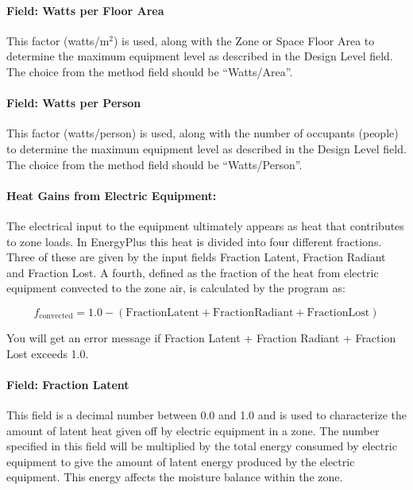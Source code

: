 \paragraph{Field: Watts per Floor Area}\label{field-watts-per-zone-floor-area-1}

This factor (watts/m\(^{2}\)) is used, along with the Zone or Space Floor Area to determine the maximum equipment level as described in the Design Level field. The choice from the method field should be ``Watts/Area''.

\paragraph{Field: Watts per Person}\label{field-watts-per-person-1}

This factor (watts/person) is used, along with the number of occupants (people) to determine the maximum equipment level as described in the Design Level field. The choice from the method field should be ``Watts/Person''.

\paragraph{Heat Gains from Electric Equipment:}\label{heat-gains-from-electric-equipment}

The electrical input to the equipment ultimately appears as heat that contributes to zone loads. In EnergyPlus this heat is divided into four different fractions. Three of these are given by the input fields Fraction Latent, Fraction Radiant and Fraction Lost. A fourth, defined as the fraction of the heat from electric equipment convected to the zone air, is calculated by the program as:

\begin{equation}
  f_{\mathrm{convected}} = 1.0 - (\mathrm{Fraction Latent} + \mathrm{Fraction Radiant} + \mathrm{Fraction Lost})
\end{equation}

You will get an error message if Fraction Latent + Fraction Radiant + Fraction Lost exceeds 1.0.

\paragraph{Field: Fraction Latent}\label{field-fraction-latent}

This field is a decimal number between 0.0 and 1.0 and is used to characterize the amount of latent heat given off by electric equipment in a zone. The number specified in this field will be multiplied by the total energy consumed by electric equipment to give the amount of latent energy produced by the electric equipment. This energy affects the moisture balance within the zone.

